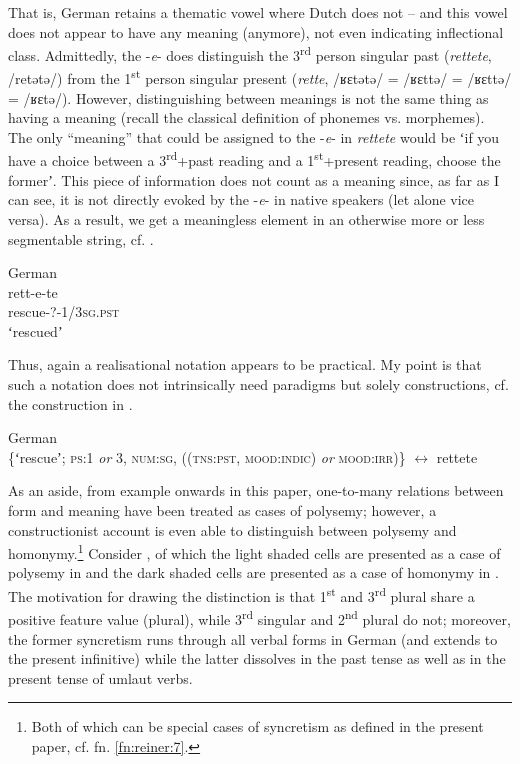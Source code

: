 \documentclass[output=paper]{langsci/langscibook}
\begin{document}
That is, German retains a thematic vowel where Dutch does not – and this vowel does not appear to have any meaning (anymore), not even indicating inflectional class. Admittedly, the \nobreakdash-\textit{e}\nobreakdash- does distinguish the 3\textsuperscript{rd} person singular past (\textit{rettete}, /retətə/) from the 1\textsuperscript{st} person singular present (\textit{rette}, /ʁɛtətə/ = /ʁɛttə/ = /ʁɛttə/ = /ʁɛtə/). However, distinguishing between meanings is not the same thing as having a meaning (recall the classical definition of phonemes vs. morphemes). The only “meaning” that could be assigned to the \nobreakdash-\textit{e}\nobreakdash- in \textit{rettete} would be ʻif you have a choice between a 3\textsuperscript{rd}+past reading and a 1\textsuperscript{st}+present reading, choose the formerʼ. This piece of information does not count as a meaning since, as far as I can see, it is not directly evoked by the \nobreakdash-\textit{e}\nobreakdash- in native speakers (let alone vice versa). As a result, we get a meaningless element in an otherwise more or less segmentable string, cf. .

\ea \label{ex:reiner:12} 
{German}\\ 
\gll rett-e-te\\
     rescue-?-1/3\textsc{sg}.\textsc{pst}\\
\glt ʻrescuedʼ
\z

Thus, again a realisational notation appears to be practical. My point is that such a notation does not intrinsically need paradigms but solely constructions, cf. the construction in .

\ea \label{ex:reiner:13}
{German}\\ 
 \textup{\{ʻrescueʼ;} \textsc{ps}\textup{:1 \textit{or} 3,} \textsc{num}\textup{:}\textsc{sg}\textup{, ((}\textsc{tns}\textup{:}\textsc{pst}, \textsc{mood}\textup{:}\textsc{indic)} \textit{or} \textsc{mood}\textup{:}\textsc{irr}\textup{)\} $\leftrightarrow $} rettete
 \z


As an aside, from example  onwards in this paper, one-to-many relations between form and meaning have been treated as cases of polysemy; however, a constructionist account is even able to distinguish between polysemy and homonymy.\footnote{Both of which can be special cases of syncretism as defined in the present paper, cf. fn. \ref{fn:reiner:7}.} Consider , of which the light shaded cells are presented as a case of polysemy in  and the dark shaded cells are presented as a case of homonymy in . The motivation for drawing the distinction is that 1\textsuperscript{st} and 3\textsuperscript{rd} plural share a positive feature value (plural), while 3\textsuperscript{rd} singular and 2\textsuperscript{nd} plural do not; moreover, the former syncretism runs through all verbal forms in German (and extends to the present infinitive) while the latter dissolves in the past tense as well as in the present tense of umlaut verbs.
\end{document}
